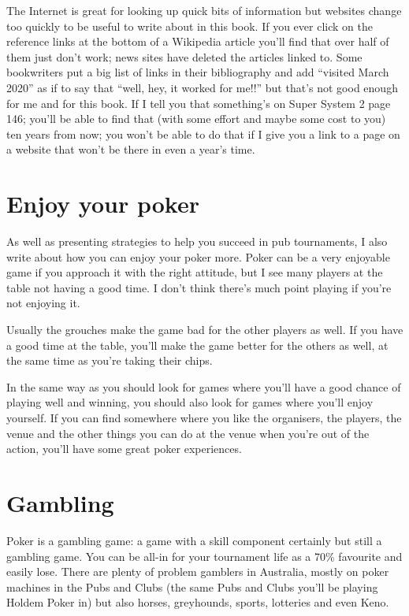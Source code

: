 The Internet is great for looking up quick bits of information but
websites change too quickly to be useful to write about in this book.
If you  ever click on the reference links at the bottom of a
Wikipedia article you'll find that over half of them just don't work;
news sites have deleted the articles linked to. Some bookwriters put a
big list of links in their bibliography and add ``visited March 2020''
as if to say that ``well, hey, it worked for me!!'' but that's not
good enough for me and for this book. If I tell you that something's
on Super System 2 page 146; you'll be able to find that (with some
effort and maybe some cost to you) ten years from now; you won't be
able to do that if I give you a link to a page on a website that won't
be there in even a year's time.


\section{Enjoy your poker}

As well as presenting strategies to help you succeed
in pub tournaments,
I also write about how you can enjoy your poker
more. Poker can be a very enjoyable game if you approach
it with the right attitude, but I see many players at the table
not having a good time. I don't think there's much
point playing if you're not enjoying it.

Usually the grouches make the game bad for the other
players as well. If you have a good time at the table, you'll make the
game better for the others as well, at the same time as you're taking
their chips.

In the same way as you should look for games where you'll have
a good chance of playing well and winning, you should
also look for games where you'll enjoy yourself.
If you can find somewhere where you like
the organisers, the players, the venue and the other things
you can do at the venue when you're out of the action,
you'll have some great poker experiences.

\section{Gambling}

Poker is a gambling
game: a game with a skill component certainly but still
a gambling game. You can be all-in for your tournament life
as a 70\% favourite and easily lose. There are plenty of problem gamblers
in Australia, mostly on poker machines in the Pubs and Clubs
(the same Pubs and Clubs you'll be playing Holdem Poker
in) but also horses, greyhounds, sports, lotteries and even Keno.

